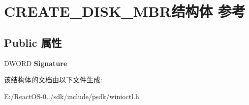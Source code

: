 \hypertarget{struct_c_r_e_a_t_e___d_i_s_k___m_b_r}{}\section{C\+R\+E\+A\+T\+E\+\_\+\+D\+I\+S\+K\+\_\+\+M\+B\+R结构体 参考}
\label{struct_c_r_e_a_t_e___d_i_s_k___m_b_r}
\subsection*{Public 属性}
\begin{DoxyCompactItemize}
\item 
\mbox{\label{struct_c_r_e_a_t_e___d_i_s_k___m_b_r_aedcfbf57f40c48a72df41e83c5f8fe63}} 
D\+W\+O\+RD {\bfseries Signature}
\end{DoxyCompactItemize}


该结构体的文档由以下文件生成\+:\begin{DoxyCompactItemize}
\item 
E\+:/\+React\+O\+S-\/0../sdk/include/psdk/winioctl.\+h\end{DoxyCompactItemize}
